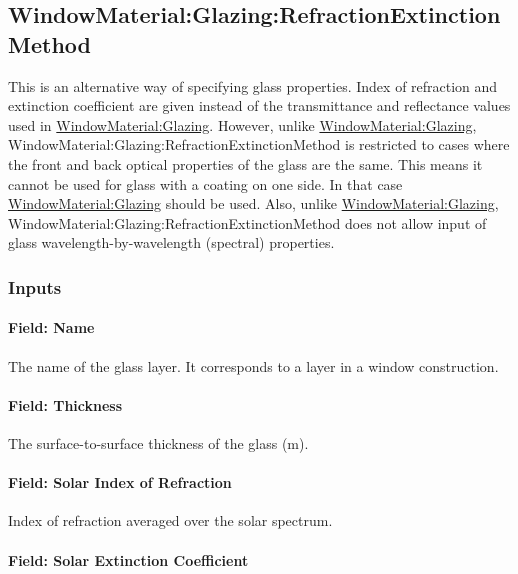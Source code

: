 \subsection{WindowMaterial:Glazing:RefractionExtinctionMethod}\label{windowmaterialglazingrefractionextinctionmethod}

This is an alternative way of specifying glass properties. Index of refraction and extinction coefficient are given instead of the transmittance and reflectance values used in \hyperref[windowmaterialglazing]{WindowMaterial:Glazing}. However, unlike \hyperref[windowmaterialglazing]{WindowMaterial:Glazing}, WindowMaterial:Glazing:RefractionExtinctionMethod is restricted to cases where the front and back optical properties of the glass are the same. This means it cannot be used for glass with a coating on one side. In that case \hyperref[windowmaterialglazing]{WindowMaterial:Glazing} should be used. Also, unlike \hyperref[windowmaterialglazing]{WindowMaterial:Glazing}, WindowMaterial:Glazing:RefractionExtinctionMethod does not allow input of glass wavelength-by-wavelength (spectral) properties.

\subsubsection{Inputs}\label{inputs-14-015}

\paragraph{Field: Name}\label{field-name-8-020}

The name of the glass layer. It corresponds to a layer in a window construction.

\paragraph{Field: Thickness}\label{field-thickness-2}

The surface-to-surface thickness of the glass (m).

\paragraph{Field: Solar Index of Refraction}\label{field-solar-index-of-refraction}

Index of refraction averaged over the solar spectrum.

\paragraph{Field: Solar Extinction Coefficient}\label{field-solar-extinction-coefficient}

